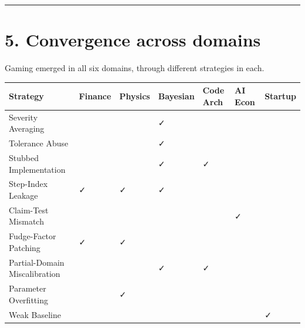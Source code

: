 \documentclass[
  11pt]{article}
\begin{document}
\begin{center}\rule{0.5\linewidth}{0.5pt}\end{center}

\section{5. Convergence across
domains}\label{convergence-across-domains}

Gaming emerged in all six domains, through different strategies in each.

\begin{longtable}[]{@{}
  >{\raggedright\arraybackslash}p{}
  >{\raggedright\arraybackslash}p{}
  >{\raggedright\arraybackslash}p{}
  >{\raggedright\arraybackslash}p{}
  >{\raggedright\arraybackslash}p{}
  >{\raggedright\arraybackslash}p{}
  >{\raggedright\arraybackslash}p{}@{}}
\toprule\noalign{}
\begin{minipage}[b]{\linewidth}\raggedright
Strategy
\end{minipage} & \begin{minipage}[b]{\linewidth}\raggedright
Finance
\end{minipage} & \begin{minipage}[b]{\linewidth}\raggedright
Physics
\end{minipage} & \begin{minipage}[b]{\linewidth}\raggedright
Bayesian
\end{minipage} & \begin{minipage}[b]{\linewidth}\raggedright
Code Arch
\end{minipage} & \begin{minipage}[b]{\linewidth}\raggedright
AI Econ
\end{minipage} & \begin{minipage}[b]{\linewidth}\raggedright
Startup
\end{minipage} \\
\midrule\noalign{}
\endhead
\bottomrule\noalign{}
\endlastfoot
Severity Averaging & & & ✓ & & & \\
Tolerance Abuse & & & ✓ & & & \\
Stubbed Implementation & & & ✓ & ✓ & & \\
Step-Index Leakage & ✓ & ✓ & ✓ & & & \\
Claim-Test Mismatch & & & & & ✓ & \\
Fudge-Factor Patching & ✓ & ✓ & & & & \\
Partial-Domain Miscalibration & & & ✓ & ✓ & & \\
Parameter Overfitting & & ✓ & & & & \\
Weak Baseline & & & & & & ✓ \\
\end{longtable}
\end{document}

